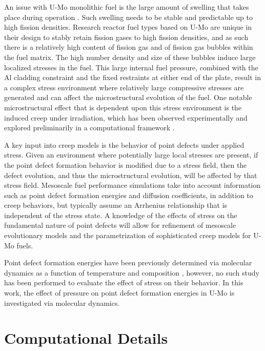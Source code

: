 \documentclass[default]{sn-jnl}%
\begin{document}
An issue with U-Mo monolithic fuel is the large amount of swelling that takes place during operation \cite{hofman1997}. Such swelling needs to be stable and predictable up to high fission densities. Research reactor fuel types based on U-Mo are unique in their design to stably retain fission gases to high fission densities, and as such there is a relatively high content of fission gas and of fission gas bubbles within the fuel matrix. The high number density and size of these bubbles induce large localized stresses in the fuel. This large internal fuel pressure, combined with the Al cladding constraint and the fixed restraints at either end of the plate, result in a complex stress environment where relatively large compressive stresses are generated and can affect the microstructural evolution of the fuel. One notable microstructural effect that is dependent upon this stress environment is the induced creep under irradiation, which has been observed experimentally \cite{kim2013} and explored preliminarily in a computational framework \cite{xmiao2021, xjian2019}. 

A key input into creep models is the behavior of point defects under applied stress. Given an environment where potentially large local stresses are present, if the point defect formation behavior is modified due to a stress field, then the defect evolution, and thus the microstructural evolution, will be affected by that stress field. Mesoscale fuel performance simulations \cite{ye2018, hu2017a} take into account information such as point defect formation energies and diffusion coefficients, in addition to creep behaviors, but typically assume an Arrhenius relationship that is independent of the stress state. A knowledge of the effects of stress on the fundamental nature of point defects will allow for refinement of mesoscale evolutionary models and the parametrization of sophisticated creep models for U-Mo fuels. 

Point defect formation energies have been previously determined via molecular dynamics as a function of temperature and composition \cite{park2021}, however, no such study has been performed to evaluate the effect of stress on their behavior. In this work, the effect of pressure on point defect formation energies in U-Mo is investigated via molecular dynamics. 

\section{Computational Details}\label{sec2}
\end{document}
